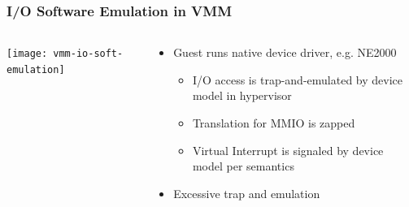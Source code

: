 \begin{frame}
	\frametitle{I/O Software Emulation in VMM}
	
	
	
	\begin{columns}
		
		\begin{column}{.4\textwidth}
			\centering
			\texttt{[image: vmm-io-soft-emulation]}
		\end{column}
		
		\begin{column}{.6\textwidth}
			\begin{itemize}
				\item Guest runs native device driver, e.g. NE2000
				\begin{itemize}
					\item I/O access is trap-and-emulated by device model in hypervisor
					\item Translation for MMIO is zapped
					\item Virtual Interrupt is signaled by device model per semantics
					
				\end{itemize} 
				\item Excessive trap and emulation

			\end{itemize} 	
			
			
		\end{column}
		
		
	\end{columns}
	
	
\end{frame}

